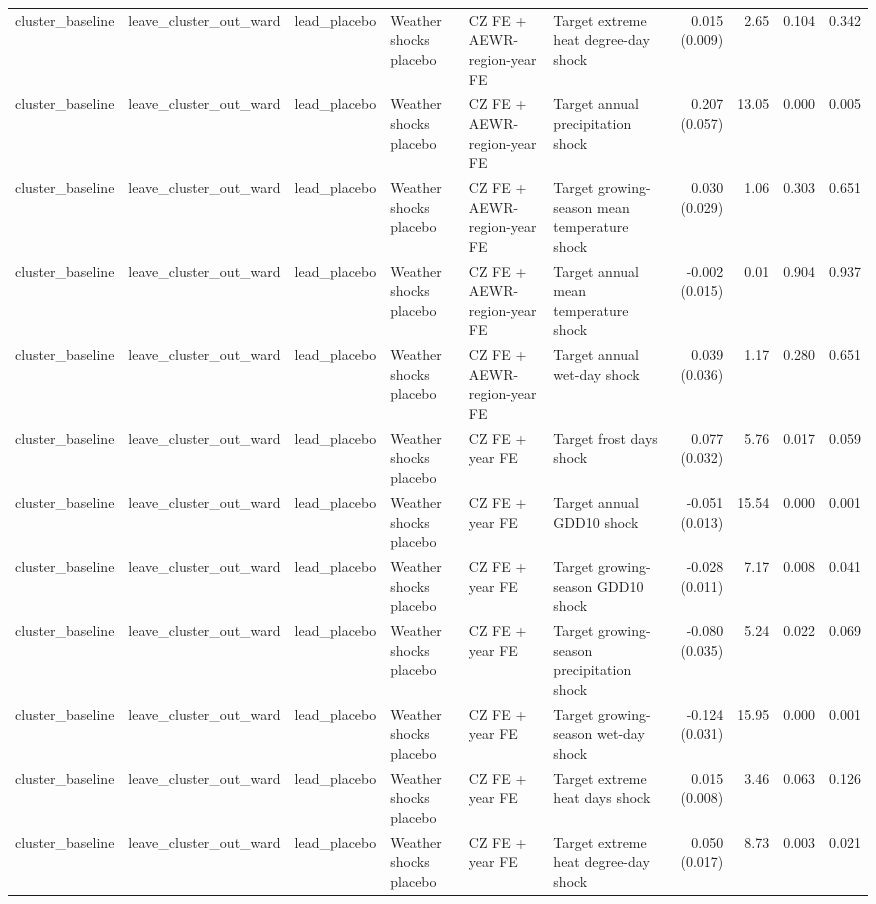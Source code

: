 \begin{tabular}{llllllrrrr}
cluster_baseline & leave_cluster_out_ward & lead_placebo & Weather shocks placebo & CZ FE + AEWR-region-year FE & Target extreme heat degree-day shock & 0.015 (0.009) & 2.65 & 0.104 & 0.342 \\
cluster_baseline & leave_cluster_out_ward & lead_placebo & Weather shocks placebo & CZ FE + AEWR-region-year FE & Target annual precipitation shock & 0.207 (0.057) & 13.05 & 0.000 & 0.005 \\
cluster_baseline & leave_cluster_out_ward & lead_placebo & Weather shocks placebo & CZ FE + AEWR-region-year FE & Target growing-season mean temperature shock & 0.030 (0.029) & 1.06 & 0.303 & 0.651 \\
cluster_baseline & leave_cluster_out_ward & lead_placebo & Weather shocks placebo & CZ FE + AEWR-region-year FE & Target annual mean temperature shock & -0.002 (0.015) & 0.01 & 0.904 & 0.937 \\
cluster_baseline & leave_cluster_out_ward & lead_placebo & Weather shocks placebo & CZ FE + AEWR-region-year FE & Target annual wet-day shock & 0.039 (0.036) & 1.17 & 0.280 & 0.651 \\
cluster_baseline & leave_cluster_out_ward & lead_placebo & Weather shocks placebo & CZ FE + year FE & Target frost days shock & 0.077 (0.032) & 5.76 & 0.017 & 0.059 \\
cluster_baseline & leave_cluster_out_ward & lead_placebo & Weather shocks placebo & CZ FE + year FE & Target annual GDD10 shock & -0.051 (0.013) & 15.54 & 0.000 & 0.001 \\
cluster_baseline & leave_cluster_out_ward & lead_placebo & Weather shocks placebo & CZ FE + year FE & Target growing-season GDD10 shock & -0.028 (0.011) & 7.17 & 0.008 & 0.041 \\
cluster_baseline & leave_cluster_out_ward & lead_placebo & Weather shocks placebo & CZ FE + year FE & Target growing-season precipitation shock & -0.080 (0.035) & 5.24 & 0.022 & 0.069 \\
cluster_baseline & leave_cluster_out_ward & lead_placebo & Weather shocks placebo & CZ FE + year FE & Target growing-season wet-day shock & -0.124 (0.031) & 15.95 & 0.000 & 0.001 \\
cluster_baseline & leave_cluster_out_ward & lead_placebo & Weather shocks placebo & CZ FE + year FE & Target extreme heat days shock & 0.015 (0.008) & 3.46 & 0.063 & 0.126 \\
cluster_baseline & leave_cluster_out_ward & lead_placebo & Weather shocks placebo & CZ FE + year FE & Target extreme heat degree-day shock & 0.050 (0.017) & 8.73 & 0.003 & 0.021 \\

\end{tabular}

